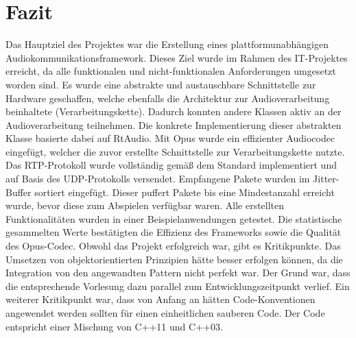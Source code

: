 \section{Fazit}
Das Hauptziel des Projektes war die Erstellung eines plattformunabhängigen Audiokommunikationsframework. Dieses Ziel wurde im Rahmen des IT-Projektes erreicht, da alle funktionalen und nicht-funktionalen Anforderungen umgesetzt worden sind.
Es wurde eine abstrakte und austauschbare Schnittstelle zur Hardware geschaffen, welche ebenfalls die Architektur zur Audioverarbeitung beinhaltete (Verarbeitungskette). Dadurch konnten andere Klassen aktiv an der Audioverarbeitung teilnehmen. Die konkrete Implementierung dieser abstrakten Klasse basierte dabei auf RtAudio.
Mit Opus wurde ein effizienter Audiocodec eingefügt, welcher die zuvor erstellte Schnittstelle zur Verarbeitungskette nutzte. Das RTP-Protokoll wurde vollständig gemäß dem Standard implementiert und auf Basis des UDP-Protokolls versendet. Empfangene Pakete wurden im Jitter-Buffer sortiert eingefügt. Dieser puffert Pakete bis eine Mindestanzahl erreicht wurde, bevor diese zum Abspielen verfügbar waren. Alle erstellten Funktionalitäten wurden in einer Beispielanwendungen getestet. Die statistische gesammelten Werte bestätigten die Effizienz des Frameworks sowie die Qualität des Opus-Codec. Obwohl das Projekt erfolgreich war, gibt es Kritikpunkte. Das Umsetzen von objektorientierten Prinzipien hätte besser erfolgen können, da die Integration von den angewandten Pattern nicht perfekt war. Der Grund war, dass die entsprechende Vorlesung dazu parallel zum Entwicklungszeitpunkt verlief. Ein weiterer Kritikpunkt war, dass von Anfang an hätten Code-Konventionen angewendet werden sollten für einen einheitlichen sauberen Code. Der Code entspricht einer Mischung von C++11 und C++03.


